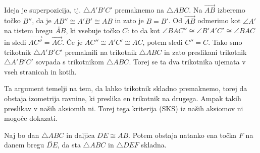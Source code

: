         \begin{dokaz}
            \\ Ideja je superpozicija, tj. $\triangle A'B'C'$ premaknemo na $\triangle ABC$. 
            Na $\overrightarrow{AB}$ izberemo točko $B''$, da je $AB''\cong A'B'\cong AB$ in zato je $B=B'$. 
            Od $\overrightarrow{AB}$ odmerimo kot $\angle A'$ na tistem bregu $\overleftrightarrow{AB}$, ki vsebuje točko $C$: to da kot $\angle BAC''\cong \angle B'A'C'\cong\angle BAC$ in sledi $\overrightarrow{AC''}=\overrightarrow{AC}$. 
            Če je $AC''\cong A'C'\cong AC$, potem sledi $C''=C$.
            Tako smo trikotnik $\triangle A'B'C'$ premaknili na trikotnik $\triangle ABC$ in zato preslikani trikotnik $\triangle A'B'C'$ sovpada s trikotnikom $\triangle ABC$. Torej se ta dva trikotnika ujemata v vseh stranicah in kotih.
        \end{dokaz}

    \begin{opomba}
        Ta argument temelji na tem, da lahko trikotnik skladno premaknemo, torej da obstaja izometrija ravnine, ki preslika en trikotnik na drugega. Ampak takih preslikav v naših aksiomih ni. Torej tega kriterija (SKS) iz naših aksiomov ni mogoče dokazati.
    \end{opomba}

    \begin{trditev}
        Naj bo dan $\triangle ABC$ in daljica $DE\cong AB$. Potem obstaja natanko ena točka $F$ na danem bregu $\overleftrightarrow{DE}$, da sta $\triangle ABC$ in $\triangle DEF$ skladna.
    \end{trditev}

